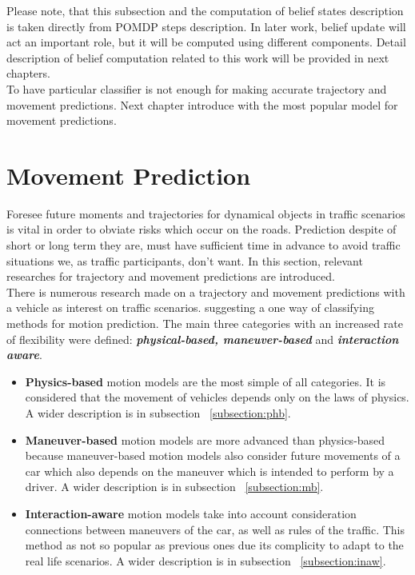 Please note, that this subsection and the computation of belief states description is taken directly from \gls{POMDP} steps description. In later work, belief update will act an important role, but it will be computed using different components. Detail description of belief computation related to this work will be provided in next chapters. \\

To have particular classifier is not enough for making accurate trajectory and movement predictions. Next chapter introduce with the most popular model for movement predictions.

\section{Movement Prediction}

Foresee future moments and trajectories for dynamical objects in traffic scenarios is vital in order to obviate risks which occur on the roads. Prediction despite of short or long term they are, must have sufficient time in advance to avoid traffic situations we, as traffic participants, don't want. In this section, relevant researches for trajectory and movement predictions are introduced. \\

There is numerous research made on a trajectory and movement predictions with a vehicle as interest on traffic scenarios. \cite{ClassificationI} suggesting a one way of classifying methods for motion prediction. The main three categories with an increased rate of flexibility were defined: \textbf{\textit{physical-based, maneuver-based}} and \textbf{\textit{interaction aware}}.

\begin{itemize}
	\item \textbf{Physics-based} motion models are the most simple of all categories. It is considered that the movement of vehicles depends only on the laws of physics. A wider description is in subsection ~\ref{subsection:phb}.
	\item \textbf{Maneuver-based} motion models are more advanced than physics-based because maneuver-based motion models also consider future movements of a car which also depends on the maneuver which is intended to perform by a driver. A wider description is in subsection ~\ref{subsection:mb}.
	\item \textbf{Interaction-aware} motion models take into account consideration connections between maneuvers of the car, as well as rules of the traffic. This method as not so popular as previous ones due its complicity to adapt to the real life scenarios. A wider description is in subsection ~\ref{subsection:inaw}.
\end{itemize}

